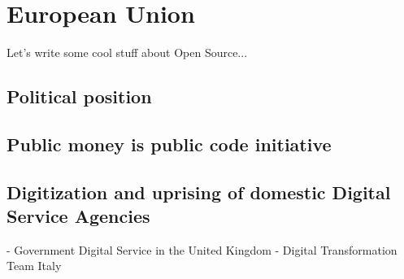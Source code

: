 \section{European Union}

Let's write some cool stuff about Open Source...


\subsection{Political position}
\subsection{Public money is public code initiative}
\subsection{Digitization and uprising of domestic Digital Service Agencies}

- Government Digital Service in the United Kingdom
- Digital Transformation Team Italy